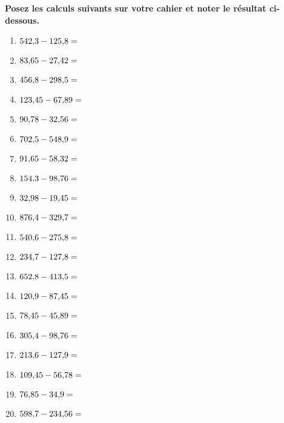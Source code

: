 \documentclass[11pt]{article}
\begin{document}
\begin{exercice}
\textbf{Posez les calculs suivants sur votre cahier et noter le résultat ci-dessous.}
\begin{multicols}{3}
\begin{enumerate}
     \item $542{,}3 - 125{,}8=\dotfill$
    \item $83{,}65 - 27{,}42=\dotfill$
    \item $456{,}8 - 298{,}5=\dotfill$
    \item $123{,}45 - 67{,}89=\dotfill$
    \item $90{,}78 - 32{,}56=\dotfill$
    \item $702{,}5 - 548{,}9=\dotfill$
    \item $91{,}65 - 58{,}32=\dotfill$
    \item $154{,}3 - 98{,}76=\dotfill$
    \item $32{,}98 - 19{,}45=\dotfill$
    \item $876{,}4 - 329{,}7=\dotfill$
    \item $540{,}6 - 275{,}8=\dotfill$
    \item $234{,}7 - 127{,}8=\dotfill$
    \item $652{,}8 - 413{,}5=\dotfill$
    \item $120{,}9 - 87{,}45=\dotfill$
    \item $78{,}45 - 45{,}89=\dotfill$
    \item $305{,}4 - 98{,}76=\dotfill$
    \item $213{,}6 - 127{,}9=\dotfill$
    \item $109{,}45 - 56{,}78=\dotfill$
    \item $76{,}85 - 34{,}9=\dotfill$
    \item $598{,}7 - 234{,}56=\dotfill$
\end{enumerate}
\end{multicols}
\end{exercice}
\end{document}
